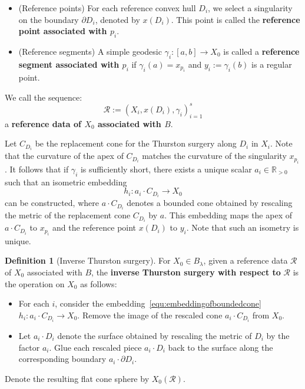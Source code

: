 \documentclass{compositio}
\numberwithin{equation}{section}
\numberwithin{figure}{section}
\theoremstyle{definition}
\newtheorem{definition}{Definition}[section]
\theoremstyle{plain}
\begin{document}
{\begin{itemize}
    \item (Reference points) For each reference convex hull $D_i$, we select a singularity on the boundary $\partial D_i$, denoted by $x(D_i)$. This point is called the \textbf{reference point associated with $p_i$}.
    
    \item (Reference segments) A simple geodesic $\gamma_i: [a, b] \to X_0$ is called a \textbf{reference segment associated with $p_i$} if $\gamma_i(a) = x_{p_i}$ and $y_i := \gamma_i(b)$ is a regular point.
\end{itemize}
We call the sequence:
$$
\mathcal{R}:= (X_i, x(D_i), \gamma_i)_{i=1}^s
$$
a \textbf{reference data of $X_0$ associated with $B$}.

Let $C_{D_i}$ be the replacement cone for the Thurston surgery along $D_i$ in $X_i$. Note that the curvature of the apex of $C_{D_i}$ matches the curvature of the singularity $x_{p_i}$. It follows that if $\gamma_i$ is sufficiently short, there exists a unique scalar $a_i \in \mathbb{R}_{>0}$ such that an isometric embedding
\begin{equation}\label{equ:embeddingofboundedcone}
    h_i: a_i \cdot C_{D_i} \to X_0
\end{equation}
can be constructed, where $a \cdot C_{D_i}$ denotes a bounded cone obtained by rescaling the metric of the replacement cone $C_{D_i}$ by $a$. This embedding maps the apex of $a \cdot C_{D_i}$ to $x_{p_i}$ and the reference point $x(D_i)$ to $y_i$. Note that such an isometry is unique.

\begin{definition}[Inverse Thurston surgery]
For $X_0 \in B_\lambda$, given a reference data $\mathcal{R}$ of $X_0$ associated with $B$, the \textbf{inverse Thurston surgery with respect to} $\mathcal{R}$ is the operation on $X_0$ as follows:
\begin{itemize}
    \item For each $i$, consider the embedding~\eqref{equ:embeddingofboundedcone} $h_i: a_i \cdot C_{D_i} \to X_0$. Remove the image of the rescaled cone $a_i \cdot C_{D_i}$ from $X_0$.
    \item Let $a_i \cdot D_i$ denote the surface obtained by rescaling the metric of $D_i$ by the factor $a_i$. Glue each rescaled piece $a_i \cdot D_i$ back to the surface along the corresponding boundary $a_i \cdot \partial D_i$.
\end{itemize}
Denote the resulting flat cone sphere by $X_0(\mathcal{R})$.
\end{definition}

}
\end{document}
